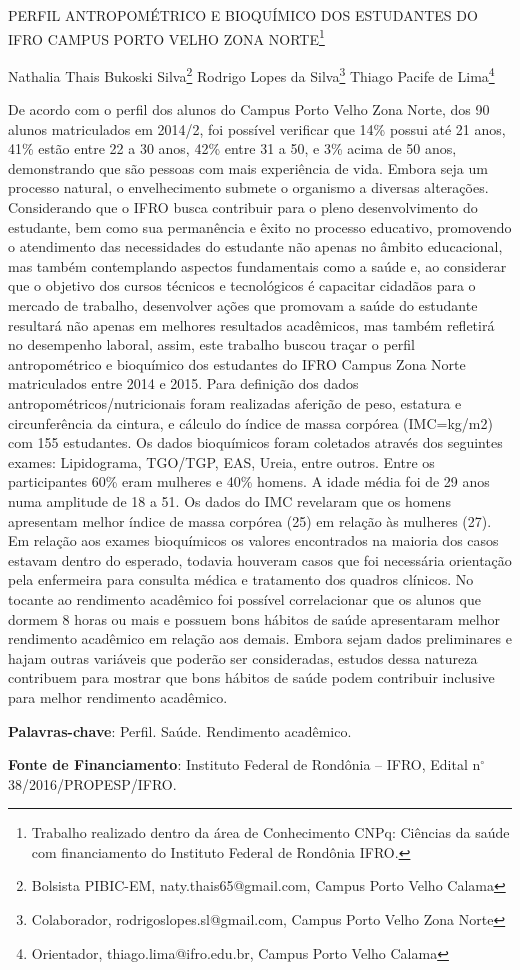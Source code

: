 \documentclass[article,12pt,onesidea,4paper,english,brazil]{abntex2}
\begin{document}
	
	
	\frenchspacing 
	
	\begin{center}
		\LARGE PERFIL ANTROPOMÉTRICO E BIOQUÍMICO DOS ESTUDANTES DO IFRO
		CAMPUS PORTO VELHO ZONA NORTE\footnote{Trabalho realizado dentro da área de Conhecimento CNPq: Ciências da saúde com financiamento
			do Instituto Federal de Rondônia IFRO.}
		
		\normalsize
		Nathalia Thais Bukoski Silva\footnote{Bolsista PIBIC-EM, naty.thais65@gmail.com, Campus Porto Velho Calama} 
		Rodrigo Lopes da Silva\footnote{Colaborador, rodrigoslopes.sl@gmail.com, Campus Porto Velho Zona Norte} 
		Thiago Pacife de Lima\footnote{Orientador, thiago.lima@ifro.edu.br, Campus Porto Velho Calama} 
		
	\end{center}
	
	\noindent De acordo com o perfil dos alunos do Campus Porto Velho Zona Norte, dos 90
	alunos matriculados em 2014/2, foi possível verificar que 14\% possui até 21 anos,
	41\% estão entre 22 a 30 anos, 42\% entre 31 a 50, e 3\% acima de 50 anos,
	demonstrando que são pessoas com mais experiência de vida. Embora seja um
	processo natural, o envelhecimento submete o organismo a diversas alterações.
	Considerando que o IFRO busca contribuir para o pleno desenvolvimento do
	estudante, bem como sua permanência e êxito no processo educativo, promovendo
	o atendimento das necessidades do estudante não apenas no âmbito educacional,
	mas também contemplando aspectos fundamentais como a saúde e, ao considerar
	que o objetivo dos cursos técnicos e tecnológicos é capacitar cidadãos para o
	mercado de trabalho, desenvolver ações que promovam a saúde do estudante
	resultará não apenas em melhores resultados acadêmicos, mas também refletirá no
	desempenho laboral, assim, este trabalho buscou traçar o perfil antropométrico e
	bioquímico dos estudantes do IFRO Campus Zona Norte matriculados entre 2014 e
	2015. Para definição dos dados antropométricos/nutricionais foram realizadas
	aferição de peso, estatura e circunferência da cintura, e cálculo do índice de massa
	corpórea (IMC=kg/m2) com 155 estudantes. Os dados bioquímicos foram coletados
	através dos seguintes exames: Lipidograma, TGO/TGP, EAS, Ureia, entre outros.
	Entre os participantes 60\% eram mulheres e 40\% homens. A idade média foi de 29
	anos numa amplitude de 18 a 51. Os dados do IMC revelaram que os homens
	apresentam melhor índice de massa corpórea (25) em relação às mulheres (27). Em
	relação aos exames bioquímicos os valores encontrados na maioria dos casos
	estavam dentro do esperado, todavia houveram casos que foi necessária orientação
	pela enfermeira para consulta médica e tratamento dos quadros clínicos. No tocante
	ao rendimento acadêmico foi possível correlacionar que os alunos que dormem 8
	horas ou mais e possuem bons hábitos de saúde apresentaram melhor rendimento
	acadêmico em relação aos demais. Embora sejam dados preliminares e hajam
	outras variáveis que poderão ser consideradas, estudos dessa natureza contribuem
	para mostrar que bons hábitos de saúde podem contribuir inclusive para melhor
	rendimento acadêmico.
	
	\vspace{\onelineskip}
	
	\noindent
	\textbf{Palavras-chave}: Perfil. Saúde. Rendimento acadêmico.
	
	\noindent
	\textbf{Fonte de Financiamento}: Instituto Federal de Rondônia – IFRO, Edital n$^{\circ}$
	38/2016/PROPESP/IFRO.
	
\end{document}
